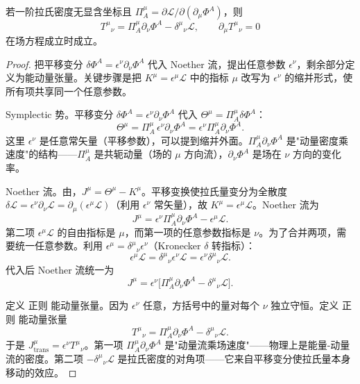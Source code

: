 \begin{proposition}
若一阶拉氏密度无显含坐标且 $\Pi_A^\mu=\partial\mathcal L/\partial(\partial_\mu\Phi^A)$，则\[T^\mu{}_\nu=\Pi_A^\mu\partial_\nu\Phi^A-\delta^\mu{}_\nu\mathcal L,\qquad\partial_\mu T^\mu{}_\nu=0\]在场方程成立时成立。
\end{proposition}

\begin{proof}
把平移变分 $\delta\Phi^A=\epsilon^\nu\partial_\nu\Phi^A$ 代入 Noether 流，提出任意参数 $\epsilon^\nu$，剩余部分定义为能动量张量。关键步骤是把 $K^\mu=\epsilon^\mu\mathcal{L}$ 中的指标 $\mu$ 改写为 $\epsilon^\nu$ 的缩并形式，使所有项共享同一个任意参数。

Symplectic 势。平移变分 $\delta\Phi^A=\epsilon^\nu\partial_\nu\Phi^A$ 代入 $\Theta^\mu=\Pi_A^\mu\delta\Phi^A$：
\begin{equation*}
\Theta^\mu=\Pi_A^\mu\,\epsilon^\nu\partial_\nu\Phi^A=\epsilon^\nu\Pi_A^\mu\partial_\nu\Phi^A.
\end{equation*}
这里 $\epsilon^\nu$ 是任意常矢量（平移参数），可以提到缩并外面。$\Pi_A^\mu\partial_\nu\Phi^A$ 是"动量密度乘速度"的结构——$\Pi_A^\mu$ 是共轭动量（场的 $\mu$ 方向流），$\partial_\nu\Phi^A$ 是场在 $\nu$ 方向的变化率。

Noether 流。由，$J^\mu=\Theta^\mu-K^\mu$。平移变换使拉氏量变分为全散度 $\delta\mathcal{L}=\epsilon^\nu\partial_\nu\mathcal{L}=\partial_\mu(\epsilon^\mu\mathcal{L})$（利用 $\epsilon^\nu$ 常矢量），故 $K^\mu=\epsilon^\mu\mathcal{L}$。Noether 流为
\begin{equation*}
J^\mu=\epsilon^\nu\Pi_A^\mu\partial_\nu\Phi^A-\epsilon^\mu\mathcal{L}.
\end{equation*}
第二项 $\epsilon^\mu\mathcal{L}$ 的自由指标是 $\mu$，而第一项的任意参数指标是 $\nu$。为了合并两项，需要统一任意参数。利用 $\epsilon^\mu=\delta^\mu{}_\nu\epsilon^\nu$（Kronecker $\delta$ 转指标）：
\begin{equation*}
\epsilon^\mu\mathcal{L}=\delta^\mu{}_\nu\epsilon^\nu\mathcal{L}=\epsilon^\nu\delta^\mu{}_\nu\mathcal{L}.
\end{equation*}
代入后 Noether 流统一为
\begin{equation*}
J^\mu=\epsilon^\nu\big[\Pi_A^\mu\partial_\nu\Phi^A-\delta^\mu{}_\nu\mathcal{L}\big].
\end{equation*}

定义 正则 能动量张量。因为 $\epsilon^\nu$ 任意，方括号中的量对每个 $\nu$ 独立守恒。定义 正则 能动量张量
\begin{equation}\label{eq:ms-poincare-T-can}
{
T^\mu{}_\nu=\Pi_A^\mu\partial_\nu\Phi^A-\delta^\mu{}_\nu\mathcal{L}.
}
\end{equation}
于是 $J^\mu_{\text{trans}}=\epsilon^\nu T^\mu{}_\nu$。第一项 $\Pi_A^\mu\partial_\nu\Phi^A$ 是"动量流乘场速度"——物理上是能量-动量流的密度。第二项 $-\delta^\mu{}_\nu\mathcal{L}$ 是拉氏密度的对角项——它来自平移变分使拉氏量本身移动的效应。


\end{proof}
